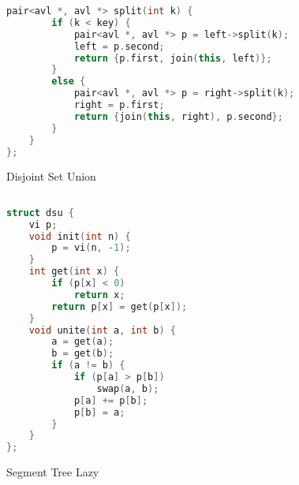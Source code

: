 \documentclass[leter]{amsart}
\begin{document}
\begin{multicols}{2}
\begin{lstlisting}[language=C++]
    pair<avl *, avl *> split(int k) {
        if (k < key) {
            pair<avl *, avl *> p = left->split(k);
            left = p.second;
            return {p.first, join(this, left)};
        }
        else {
            pair<avl *, avl *> p = right->split(k);
            right = p.first;
            return {join(this, right), p.second};
        }
    }
};


\end{lstlisting}
\end{multicols}
Disjoint Set Union
\begin{multicols}{2}
\begin{lstlisting}[language=C++]
 
struct dsu {
    vi p;
    void init(int n) {
        p = vi(n, -1);
    }
    int get(int x) {
        if (p[x] < 0)
            return x;
        return p[x] = get(p[x]);
    }
    void unite(int a, int b) {
        a = get(a);
        b = get(b);
        if (a != b) {
            if (p[a] > p[b])
                swap(a, b);
            p[a] += p[b];
            p[b] = a;
        }
    }
};


\end{lstlisting}
\end{multicols}
Segment Tree Lazy
\end{document}
